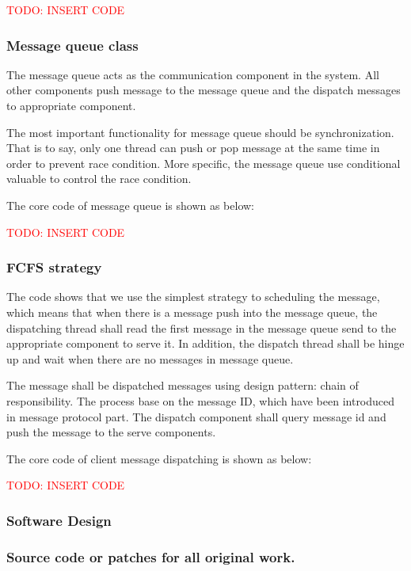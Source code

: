 \documentclass[11pt,a4paper,titlepage]{report}
\begin{document}
\textcolor{red}{TODO: INSERT CODE}


\subsubsection{Message queue class}

The message queue acts as the communication component in the system. All other components push message to the message queue and the dispatch messages to appropriate component. 

The most important functionality for message queue should be synchronization. That is to say, only one thread can push or pop message at the same time in order to prevent race condition. More specific, the message queue use conditional valuable to control the race condition. 

The core code of message queue is shown as below:

\textcolor{red}{TODO: INSERT CODE}


\subsubsection{FCFS strategy}

The code shows that we use the simplest strategy to scheduling the message, which means that when there is a message push into the message queue, the dispatching thread shall read the first message in the message queue send to the appropriate component to serve it. In addition, the dispatch thread shall be hinge up and wait when there are no messages in message queue.

The message shall be dispatched messages using design pattern: chain of responsibility. The process base on the message ID, which have been introduced in message protocol part. The dispatch component shall query message id and push the message to the serve components.

The core code of client message dispatching is shown as below:

\textcolor{red}{TODO: INSERT CODE}





\subsubsection{Software Design}

\subsubsection{Source code or patches for all original work.}
\end{document}
